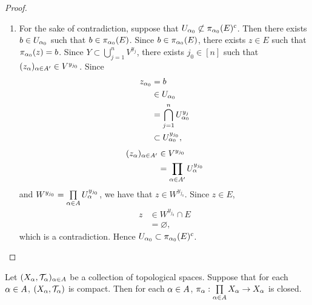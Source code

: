 \documentclass{book}
\begin{document}
\begin{proof}
\begin{enumerate}
\begin{enumerate}
 				\item For the sake of contradiction, suppose that $U_{\alpha_0} \not \subset \pi_{\alpha_0}(E)^c$. Then there exists $b \in U_{\alpha_0}$ such that $b \in \pi_{\alpha_0}(E)$.  Since $b \in \pi_{\alpha_0}(E)$, there exists $z \in E$ such that $\pi_{\alpha_0}(z) = b$. Since $Y \subset \bigcup\limits_{j=1}^n V^{y_j}$, there exists $j_0 \in [n]$ such that $(z_{\alpha})_{\alpha \in A'} \in V^{y_{j_0}}$. Since 
 				\begin{align*}
 					z_{\alpha_0}
 					& = b \\
 					& \in U_{\alpha_0} \\
 					& = \bigcap\limits_{j=1}^n U_{\alpha_0}^{y_j} \\
 					& \subset U_{\alpha_0}^{y_{j_0}},
 				\end{align*}
 				\begin{align*}
 					(z_{\alpha})_{\alpha \in A'}
 					& \in V^{y_{j_0}} \\
 					& = \prod\limits_{\alpha \in A'} U_{\alpha}^{y_{j_0}}
 				\end{align*}
 				and $W^{y_{j_0}} = \prod\limits_{\alpha \in A}U_{\alpha}^{y_{j_0}}$, we have that $z \in W^{y_{j_0}}$. Since $z \in E$, 
 				\begin{align*}
 					z 
 					& \in W^{y_{j_0}} \cap E \\
 					& = \varnothing,
 				\end{align*}
 				which is a contradiction. Hence $U_{\alpha_0} \subset \pi_{\alpha_0}(E)^c$.
 			\end{enumerate}
 		\end{enumerate}
 	\end{proof}
 
 	
 
 \begin{ex} 
 	Let $(X_{\alpha}, \mathcal{T}_{\alpha})_{\alpha \in A}$ be a collection of topological spaces. Suppose that for each $\alpha \in A$, $(X_{\alpha} , \mathcal{T}_{\alpha})$ is compact. Then for each $\alpha \in A$, $\pi_{\alpha}: \prod\limits_{\alpha \in A} X_{\alpha} \rightarrow X_{\alpha}$ is closed. \\
 	 
 \end{ex}
 
\end{document}
